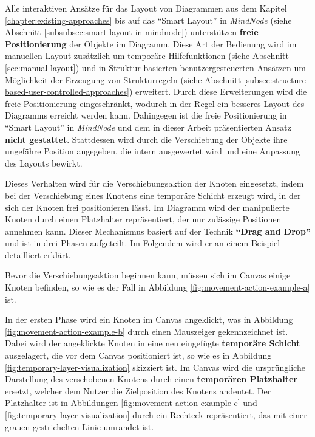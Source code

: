 Alle interaktiven Ansätze für das Layout von Diagrammen aus dem Kapitel \ref{chapter:existing-approaches} bis auf das \enquote{Smart Layout} in \textit{MindNode} (siehe Abschnitt \ref{subsubsec:smart-layout-in-mindnode}) unterstützen \textbf{freie Positionierung} der Objekte im Diagramm. Diese Art der Bedienung wird im manuellen Layout zusätzlich um temporäre Hilfefunktionen (siehe Abschnitt \ref{sec:manual-layout}) und in Struktur-basierten benutzergesteuerten Ansätzen um Möglichkeit der Erzeugung von Strukturregeln (siehe Abschnitt \ref{subsec:structure-based-user-controlled-approaches}) erweitert. Durch diese Erweiterungen wird die freie Positionierung eingeschränkt, wodurch in der Regel ein besseres Layout des Diagramms erreicht werden kann. Dahingegen ist die freie Positionierung in \enquote{Smart Layout} in \textit{MindNode} und dem in dieser Arbeit präsentierten Ansatz \textbf{nicht gestattet}. Stattdessen wird durch die Verschiebung der Objekte ihre ungefähre Position angegeben, die intern ausgewertet wird und eine Anpassung des Layouts bewirkt.

Dieses Verhalten wird für die Verschiebungsaktion der Knoten eingesetzt, indem bei der Verschiebung eines Knotens eine temporäre Schicht erzeugt wird, in der sich der Knoten frei positionieren lässt. Im Diagramm wird der manipulierte Knoten durch einen Platzhalter repräsentiert, der nur zulässige Positionen annehmen kann. Dieser Mechanismus basiert auf der Technik \textbf{\enquote{Drag and Drop}} und ist in drei Phasen aufgeteilt. Im Folgendem wird er an einem Beispiel detailliert erklärt.

Bevor die Verschiebungsaktion beginnen kann, müssen sich im Canvas einige Knoten befinden, so wie es der Fall in Abbildung \ref{fig:movement-action-example-a} ist.

In der ersten Phase wird ein Knoten im Canvas angeklickt, was in Abbildung \ref{fig:movement-action-example-b} durch einen Mauszeiger gekennzeichnet ist. Dabei wird der angeklickte Knoten in eine neu eingefügte \textbf{temporäre Schicht} ausgelagert, die vor dem Canvas positioniert ist, so wie es in Abbildung \ref{fig:temporary-layer-visualization} skizziert ist. Im Canvas wird die ursprüngliche Darstellung des verschobenen Knotens durch einen \textbf{temporären Platzhalter} ersetzt, welcher dem Nutzer die Zielposition des Knotens andeutet. Der Platzhalter ist in Abbildungen \ref{fig:movement-action-example-c} und \ref{fig:temporary-layer-visualization} durch ein Rechteck repräsentiert, das mit einer grauen gestrichelten Linie umrandet ist.

